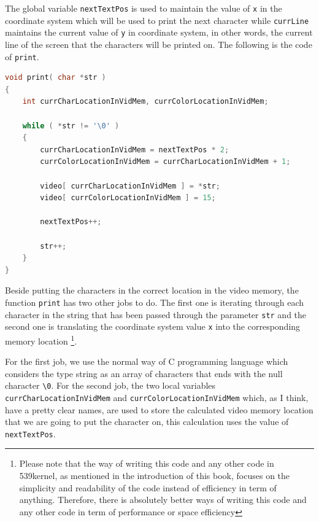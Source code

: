 The global variable \lstinline!nextTextPos! is used to maintain the
value of \lstinline!x! in the coordinate system which will be used to
print the next character while \lstinline!currLine! maintains the
current value of \lstinline!y! in coordinate system, in other words, the
current line of the screen that the characters will be printed on. The
following is the code of \lstinline!print!.

\begin{lstlisting}[language=C]
void print( char *str )
{
    int currCharLocationInVidMem, currColorLocationInVidMem;
    
    while ( *str != '\0' )
    {
        currCharLocationInVidMem = nextTextPos * 2;
        currColorLocationInVidMem = currCharLocationInVidMem + 1;
        
        video[ currCharLocationInVidMem ] = *str;
        video[ currColorLocationInVidMem ] = 15;
        
        nextTextPos++;
        
        str++;
    }
}
\end{lstlisting}

Beside putting the characters in the correct location in the video
memory, the function \lstinline!print! has two other jobs to do. The
first one is iterating through each character in the string that has
been passed through the parameter \lstinline!str! and the second one is
translating the coordinate system value \lstinline!x! into the
corresponding memory location \footnote{Please note that the way of
  writing this code and any other code in 539kernel, as mentioned in the
  introduction of this book, focuses on the simplicity and readability
  of the code instead of efficiency in term of anything. Therefore,
  there is absolutely better ways of writing this code and any other
  code in term of performance or space efficiency}.

For the first job, we use the normal way of C programming language which
considers the type string as an array of characters that ends with the
null character \lstinline!\0!. For the second job, the two local
variables \lstinline!currCharLocationInVidMem! and
\lstinline!currColorLocationInVidMem! which, as I think, have a pretty
clear names, are used to store the calculated video memory location that
we are going to put the character on, this calculation uses the value of
\lstinline!nextTextPos!.

